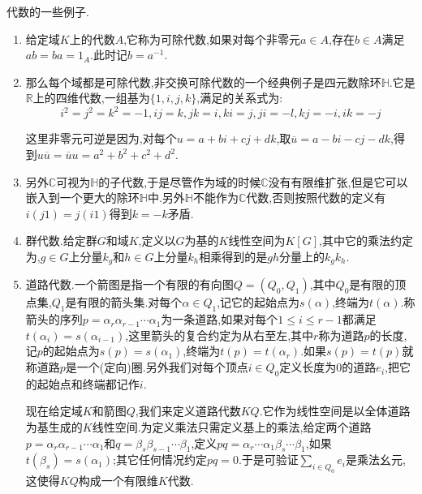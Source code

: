代数的一些例子.
\begin{enumerate}
	\item 给定域$K$上的代数$A$,它称为可除代数,如果对每个非零元$a\in A$,存在$b\in A$满足$ab=ba=1_A$.此时记$b=a^{-1}$.
	\item 那么每个域都是可除代数,非交换可除代数的一个经典例子是四元数除环$\mathbb{H}$.它是$\mathbb{R}$上的四维代数,一组基为$\{1,i,j,k\}$,满足的关系式为:
	$$i^2=j^2=k^2=-1,ij=k,jk=i,ki=j,ji=-l,kj=-i,ik=-j$$
	
	这里非零元可逆是因为,对每个$u=a+bi+cj+dk$,取$\overline{u}=a-bi-cj-dk$,得到$u\overline{u}=\overline{u}u=a^2+b^2+c^2+d^2$.
	\item 另外$\mathbb{C}$可视为$\mathbb{H}$的子代数,于是尽管作为域的时候$\mathbb{C}$没有有限维扩张,但是它可以嵌入到一个更大的除环$\mathbb{H}$中.另外$\mathbb{H}$不能作为$\mathbb{C}$代数,否则按照代数的定义有$i(j1)=j(i1)$得到$k=-k$矛盾.
	\item 群代数.给定群$G$和域$K$,定义以$G$为基的$K$线性空间为$K[G]$,其中它的乘法约定为,$g\in G$上分量$k_g$和$h\in G$上分量$k_h$相乘得到的是$gh$分量上的$k_gk_h$.
	\item 道路代数.一个箭图是指一个有限的有向图$Q=(Q_0,Q_1)$,其中$Q_0$是有限的顶点集,$Q_1$是有限的箭头集.对每个$\alpha\in Q_1$,记它的起始点为$s(\alpha)$,终端为$t(\alpha)$.称箭头的序列$p=\alpha_r\alpha_{r-1}\cdots\alpha_1$为一条道路,如果对每个$1\le i\le r-1$都满足$t(\alpha_i)=s(\alpha_{i-1})$,这里箭头的复合约定为从右至左,其中$r$称为道路$p$的长度,记$p$的起始点为$s(p)=s(\alpha_1)$,终端为$t(p)=t(\alpha_r)$.如果$s(p)=t(p)$就称道路$p$是一个(定向)圈.另外我们对每个顶点$i\in Q_0$定义长度为0的道路$e_i$,把它的起始点和终端都记作$i$.
	
	现在给定域$K$和箭图$Q$,我们来定义道路代数$KQ$.它作为线性空间是以全体道路为基生成的$K$线性空间.为定义乘法只需定义基上的乘法,给定两个道路$p=\alpha_r\alpha_{r-1}\cdots\alpha_1$和$q=\beta_s\beta_{s-1}\cdots\beta_1$,定义$pq=\alpha_r\cdots\alpha_1\beta_s\cdots\beta_1$,如果$t(\beta_s)=s(\alpha_1)$;其它任何情况约定$pq=0$.于是可验证$\sum_{i\in Q_0}e_i$是乘法幺元,这使得$KQ$构成一个有限维$K$代数.
\end{enumerate}


